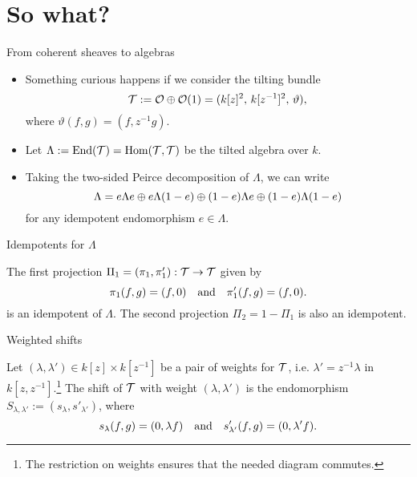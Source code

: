 \documentclass[
  xcolor=dvipsnames,
  aspectratio=169,
  compress
]{beamer}
\begin{document}
\section{So what?}

\begin{frame}{From coherent sheaves to algebras}
  \begin{itemize}
    \item
      Something curious happens if we consider the \alert{tilting bundle}
      \[
        \mathcal{T}
        := \mathcal{O} \oplus \mathcal{O}({1})
        = (k[z]^2,\, k[z^{-1}]^2,\, \vartheta),
      \]
      where $\vartheta(f, g) = (f, z^{-1}g)$.

      \pause
    \item
      Let $\Lambda := \operatorname{End}(\mathcal{T}) = \operatorname{Hom}(\mathcal{T}, \mathcal{T})$ be the \alert{tilted algebra} over $k$.

      \pause
    \item
      Taking the two-sided \alert{Peirce decomposition} of $\Lambda$, we can write
      \[
        \Lambda = e \Lambda e \oplus e \Lambda (1 - e) \oplus (1 - e) \Lambda e \oplus (1 - e) \Lambda (1 - e)
      \]
      for any idempotent endomorphism $e \in \Lambda$.
  \end{itemize}
\end{frame}

\begin{frame}{Idempotents for $\Lambda$}
  \begin{fact}
    The \alert{first projection} $\Pi_1 = (\pi_1, \pi_1'): \mathcal{T} \to \mathcal{T}$ given by
    \[
      \pi_1(f, g) = (f, 0)
      \quad \text{and} \quad
      \pi_1'(f, g) = (f, 0).
    \]
    is an idempotent of $\Lambda$.
    The \alert{second projection} $\Pi_2 = 1 - \Pi_1$ is also an idempotent.
  \end{fact}
\end{frame}

\begin{frame}{Weighted shifts}
  \begin{definition}
    Let $(\lambda, \lambda') \in k[z] \times k[z^{-1}]$ be a pair of \alert{weights} for $\mathcal{T}$, i.e. $\lambda' = z^{-1} \lambda$ in $k[z, z^{-1}]$.\footnote{The restriction on weights ensures that the needed diagram commutes.}
    The \alert{shift of $\mathcal{T}$ with weight $(\lambda, \lambda')$} is the endomorphism $S_{\lambda, \lambda'} := (s_\lambda, s'_{\lambda'})$, where
    \[
      s_\lambda(f, g) = (0, \lambda f) \quad \text{and} \quad s'_{\lambda'}(f, g) = (0, \lambda' f).
    \]
  \end{definition}
\end{frame}
\end{document}
